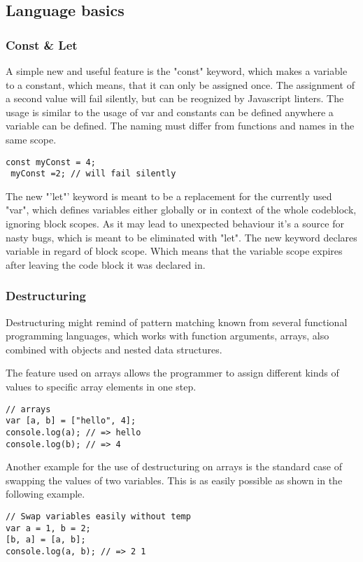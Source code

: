 \documentclass{bioinfo}
\begin{document}
\subsection{Language basics}
\subsubsection{Const \& Let}
A simple new and useful feature is the "const" keyword, which makes a variable to a constant, which means, 
that it can only be assigned once. The assignment of a second value will fail silently, but can be reognized by
Javascript linters. The usage is similar to the usage of var and constants can be defined anywhere a variable can be defined.
The naming must differ from functions and names in the same scope. 
\begin{lstlisting}[caption= My Javascript Example]
const myConst = 4;
 myConst =2; // will fail silently
\end{lstlisting}

The new "'let"' keyword is meant to be a replacement for the currently used "var", which defines variables 
either globally or in context of the whole codeblock, ignoring block scopes. As it may lead to unexpected behaviour
it's a source for nasty bugs, which is meant to be eliminated with "let". The new keyword declares variable in 
regard of block scope. Which means that the variable scope expires after leaving the code block it was declared in.


\subsubsection{Destructuring}
Destructuring might remind of pattern matching known from several functional programming languages, which works with function arguments,
arrays, also combined with objects and nested data structures.

The feature used on arrays allows the programmer to assign different kinds of values to specific array elements in one step.
\begin{lstlisting}[caption= My Javascript Example]
// arrays
var [a, b] = ["hello", 4];
console.log(a); // => hello
console.log(b); // => 4
\end{lstlisting}

Another example for the use of destructuring on arrays is the standard case of swapping the values of two variables.
This is as easily possible as shown in the following example.
\begin{lstlisting}[caption= My Javascript Example]
// Swap variables easily without temp
var a = 1, b = 2;
[b, a] = [a, b];
console.log(a, b); // => 2 1
\end{lstlisting}
\end{document}

